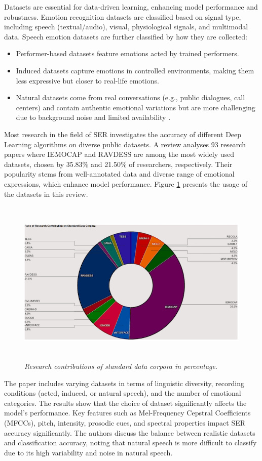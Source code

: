 Datasets are essential for data-driven learning, enhancing model performance and robustness. Emotion recognition datasets are classified based on signal type, including speech (textual/audio), visual, physiological signals, and multimodal data. Speech emotion datasets are further classified by how they are collected: 
\begin{itemize}
    \item Performer-based datasets feature emotions acted by trained performers. 
    \item Induced datasets capture emotions in controlled environments, making them less expressive but closer to real-life emotions. 
    \item Natural datasets come from real conversations (e.g., public dialogues, call centers) and contain authentic emotional variations but are more challenging due to background noise and limited availability \autocite{Cai2023}. 
\end{itemize}
Most research in the field of SER investigates the accuracy of different Deep Learning algorithms on diverse public datasets. A review \autocite{Rathi2024} analyses 93 research papers where IEMOCAP and RAVDESS are among the most widely used datasets, chosen by 35.83\% and 21.50\% of researchers, respectively. Their popularity stems from well-annotated data and diverse range of emotional expressions, which enhance model performance. Figure \ref{fig:datasets-percentage} presents the usage of the datasets in this review.  
\begin{figure}[ht]
    \centering
    \includegraphics[height=8cm]{png/datasets percentage.png}
    \caption{\textit{Research contributions of standard data corpora in percentage}\autocite{Rathi2024}.}
    \label{fig:datasets-percentage}
\end{figure}
The paper \autocite{Rathi2024} includes varying datasets in terms of linguistic diversity, recording conditions (acted, induced, or natural speech), and the number of emotional categories. The results show that the choice of dataset significantly affects the model's performance. Key features such as Mel-Frequency Cepstral Coefficients (MFCCs), pitch, intensity, prosodic cues, and spectral properties impact SER accuracy significantly. The authors discuss the balance between realistic datasets and classification accuracy, noting that natural speech is more difficult to classify due to its high variability and noise in natural speech. 

